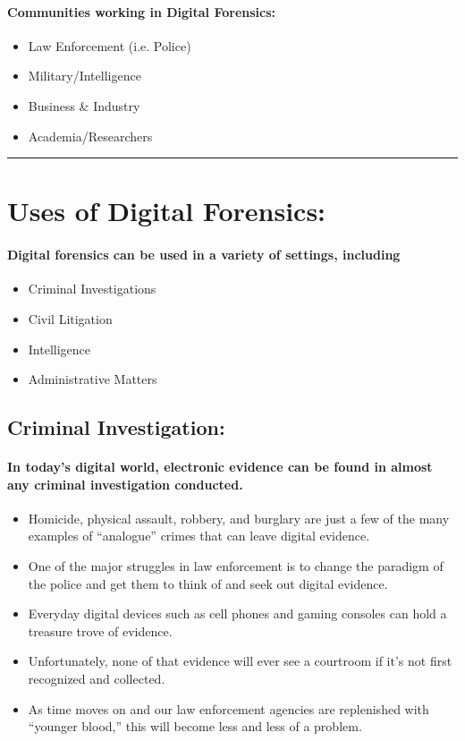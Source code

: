 \documentclass[british]{article}
\begin{document}
\paragraph{Communities working in Digital Forensics:}
\begin{itemize}
	\item Law Enforcement (i.e. Police)
	\item Military/Intelligence
	\item Business \& Industry
	\item Academia/Researchers
\end{itemize}
\rule[0.5ex]{0.75\columnwidth}{1pt}

\vfill{}


\section{Uses of Digital Forensics:}

\paragraph*{Digital forensics can be used in a variety of settings, including}
\begin{itemize}
	\item Criminal Investigations
	\item Civil Litigation
	\item Intelligence
	\item Administrative Matters
\end{itemize}

\subsection{Criminal Investigation:}

\paragraph{In today\textquoteright s digital world, electronic evidence can
	be found in almost any criminal investigation conducted. }
\begin{itemize}
	\item Homicide, physical assault, robbery, and burglary are just a few of
	      the many examples of ``analogue'' crimes that can leave digital
	      evidence.
	\item One of the major struggles in law enforcement is to change the paradigm
	      of the police and get them to think of and seek out digital evidence.
	\item Everyday digital devices such as cell phones and gaming consoles can
	      hold a treasure trove of evidence.
	\item Unfortunately, none of that evidence will ever see a courtroom if
	      it's not first recognized and collected.
	\item As time moves on and our law enforcement agencies are replenished
	      with ``younger blood,'' this will become less and less of a problem.
\end{itemize}
\end{document}
